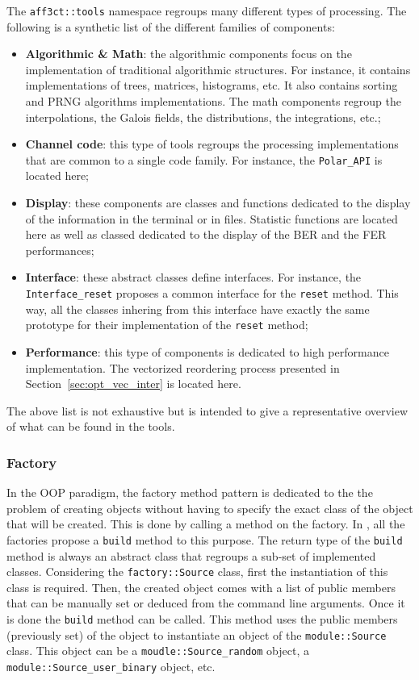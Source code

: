The \verb|aff3ct::tools| namespace regroups many different types of processing.
The following is a synthetic list of the different families of components:
\begin{itemize}
  \item \textbf{Algorithmic \& Math}: the algorithmic components focus on the
    implementation of traditional algorithmic structures. For instance, it
    contains implementations of trees, matrices, histograms, etc. It also
    contains sorting and PRNG algorithms implementations. The math components
    regroup the interpolations, the Galois fields, the distributions, the
    integrations, etc.;
  \item \textbf{Channel code}: this type of tools regroups the processing
    implementations that are common to a single code family. For instance, the
    \verb|Polar_API| is located here;
  \item \textbf{Display}: these components are classes and functions dedicated
    to the display of the information in the terminal or in files. Statistic
    functions are located here as well as classed dedicated to the display of
    the BER and the FER performances;
  \item \textbf{Interface}: these abstract classes define interfaces. For
    instance, the \verb|Interface_reset| proposes a common interface for the
    \verb|reset| method. This way, all the classes inhering from this interface
    have exactly the same prototype for their implementation of the \verb|reset|
    method;
  \item \textbf{Performance}: this type of components is dedicated to high
    performance implementation. The vectorized reordering process presented in
    Section~\ref{sec:opt_vec_inter} is located here.
\end{itemize}
The above list is not exhaustive but is intended to give a representative
overview of what can be found in the tools.

\subsubsection{Factory}

In the OOP paradigm, the factory method pattern is dedicated to the the problem
of creating objects without having to specify the exact class of the object that
will be created. This is done by calling a method on the factory. In \AFFECT,
all the factories propose a \verb|build| method to this purpose. The return type
of the \verb|build| method is always an abstract class that regroups a sub-set
of implemented classes. Considering the \verb|factory::Source| class, first the
instantiation of this class is required. Then, the created object comes with a
list of public members that can be manually set or deduced from the command line
arguments. Once it is done the \verb|build| method can be called. This method
uses the public members (previously set) of the object to instantiate an object
of the \verb|module::Source| class. This object can be a
\verb|moudle::Source_random| object, a \verb|module::Source_user_binary| object,
etc.

